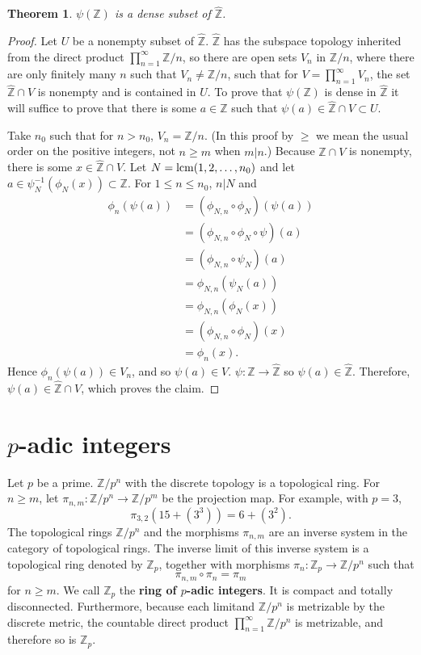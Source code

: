 \documentclass{article}
\newcommand{\lcm}{\ensuremath\mathrm{lcm}}
\newtheorem{theorem}{Theorem}
\theoremstyle{definition}
\begin{document}
\begin{theorem}
$\psi(\mathbb{Z})$ is a dense subset of $\widehat{\mathbb{Z}}$.
\end{theorem}
\begin{proof}
Let $U$ be a nonempty subset of $\widehat{\mathbb{Z}}$. $\widehat{\mathbb{Z}}$ has the subspace topology inherited
from the direct product $\prod_{n=1}^\infty \mathbb{Z}/n$,
so 
there are open sets $V_n$ in $\mathbb{Z}/n$, where there are only finitely many $n$ such that $V_n \neq \mathbb{Z}/n$,
such that for $V = \prod_{n=1}^\infty V_n$, the set $\widehat{\mathbb{Z}} \cap V$ is nonempty and is contained in $U$. 
To prove that $\psi(\mathbb{Z})$ is dense in $\widehat{\mathbb{Z}}$ it will suffice to prove that
there is some $a \in \mathbb{Z}$ such that $\psi(a) \in \widehat{\mathbb{Z}} \cap V \subset  U$. 

Take $n_0$ such that for $n > n_0$, $V_n = \mathbb{Z}/n$. (In this proof by $\geq$ we mean the usual order on the positive integers, not $n \geq m$ when
$m|n$.)
Because  $\widehat{\mathbb{Z}} \cap V$ is nonempty, there is some $x \in  \widehat{\mathbb{Z}} \cap V$. 
Let $N=\lcm(1,2,\ldots,n_0)$ and let $a \in \psi_N^{-1}(\phi_N(x)) \subset \mathbb{Z}$. For $1 \leq n \leq n_0$,  $n|N$ and
\begin{align*}
\phi_n(\psi(a))&=(\phi_{N,n} \circ \phi_N)(\psi(a))\\
&=(\phi_{N,n} \circ \phi_N \circ \psi)(a)\\
&=(\phi_{N,n} \circ \psi_N)(a)\\
&=\phi_{N,n}(\psi_N(a))\\
&=\phi_{N,n}(\phi_N(x))\\
&=(\phi_{N,n} \circ \phi_N)(x)\\
&=\phi_n(x).
\end{align*}
Hence $\phi_n(\psi(a)) \in V_n$, and so $\psi(a) \in V$.
$\psi:\mathbb{Z} \to \widehat{\mathbb{Z}}$ so  $\psi(a) \in \widehat{\mathbb{Z}}$. Therefore,
$\psi(a) \in \widehat{\mathbb{Z}} \cap V$, which proves the claim.
\end{proof}




\section{$p$-adic integers}
Let $p$ be a prime. $\mathbb{Z}/p^n$ with the discrete topology is a topological ring. 
For $n \geq m$, let $\pi_{n,m}:\mathbb{Z}/p^n \to \mathbb{Z}/p^m$
be the projection map. For example, with $p=3$,
\[
\pi_{3,2}(15+(3^3)) = 6+(3^2).
\]
The topological rings $\mathbb{Z}/p^n$ and the morphisms $\pi_{n,m}$ are an inverse system in the category of topological rings. 
The inverse limit of this inverse system is a topological ring denoted by $\mathbb{Z}_p$, together with morphisms
$\pi_n:\mathbb{Z}_p \to \mathbb{Z}/p^n$ such that
\[
\pi_{n,m} \circ \pi_n = \pi_m
\]
 for $n \geq m$.
We call $\mathbb{Z}_p$ the \textbf{ring of $p$-adic integers}. It is compact and totally disconnected. 
Furthermore, because each limitand $\mathbb{Z}/p^n$ is metrizable by the discrete metric, the countable direct product
$\prod_{n=1}^\infty \mathbb{Z}/p^n$ is metrizable, and therefore so is $\mathbb{Z}_p$. 
\end{document}

